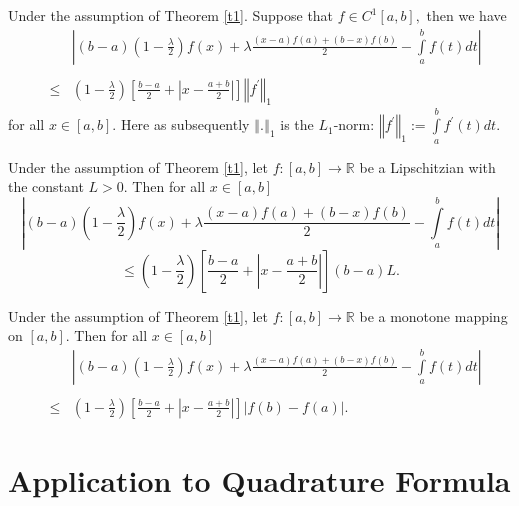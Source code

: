 \documentclass[
11pt,%
tightenlines,%
twoside,%
onecolumn,%
nofloats,%
nobibnotes,%
nofootinbib,%
superscriptaddress,%
noshowpacs,%
centertags]%
{revtex4}
\begin{document}
\begin{corollary}
Under the assumption of Theorem \ref{t1}. Suppose that $f\in C^{1}\left[ a,b%
\right] ,$ then we have
\begin{eqnarray*}
&&\left\vert \left( b-a\right) \left( 1-\frac{\lambda }{2}\right) f\left(
x\right) +\lambda \frac{\left( x-a\right) f(a)+\left( b-x\right) f(b)}{2}%
-\int\limits_{a}^{b}f(t)dt\right\vert \\
&& \\
&\leq &\left( 1-\frac{\lambda }{2}\right) \left[ \frac{b-a}{2}+\left\vert x-%
\frac{a+b}{2}\right\vert \right] \left\Vert f^{\prime }\right\Vert _{1}
\end{eqnarray*}%
for all $x\in \left[ a,b\right].$ Here as subsequently $\left\Vert
.\right\Vert _{1}$ is the $L_{1}$-norm: $ \left\Vert f^{\prime
}\right\Vert _{1}:=\int\limits_{a}^{b}f^{\prime }(t)dt. $
\end{corollary}

\begin{corollary}
\label{c4} Under the assumption of Theorem \ref{t1}, let $f:\left[
a,b\right] \rightarrow \mathbb{R}
$ be a Lipschitzian with the constant $L>0.$ Then for all $x\in \left[ a,b\right]$%
$$
\left\vert \left( b-a\right) \left( 1-\frac{\lambda }{2}\right)
f\left(
x\right) +\lambda \frac{\left( x-a\right) f(a)+\left( b-x\right) f(b)}{2}%
-\int\limits_{a}^{b}f(t)dt\right\vert
$$
$$
\leq \left( 1-\frac{\lambda }{2}\right) \left[ \frac{b-a}{2}+\left\vert x-%
\frac{a+b}{2}\right\vert \right] \left( b-a\right) L.
$$
\end{corollary}

\begin{corollary}
Under the assumption of Theorem \ref{t1}, let $f:\left[ a,b\right]
\rightarrow \mathbb{R} $ be a monotone mapping on $\left[ a,b\right]
.$ Then for all $x\in \left[ a,b\right]$
\begin{eqnarray*}
&&\left\vert \left( b-a\right) \left( 1-\frac{\lambda }{2}\right) f\left(
x\right) +\lambda \frac{\left( x-a\right) f(a)+\left( b-x\right) f(b)}{2}%
-\int\limits_{a}^{b}f(t)dt\right\vert \\
&& \\
&\leq &\left( 1-\frac{\lambda }{2}\right) \left[ \frac{b-a}{2}+\left\vert x-%
\frac{a+b}{2}\right\vert \right] \left\vert f(b)-f(a)\right\vert.
\end{eqnarray*}%
\end{corollary}

\section{Application to Quadrature Formula}
\end{document}
